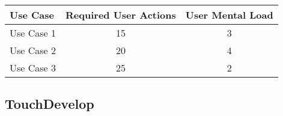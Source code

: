 

\begin{tabular*}{\textwidth}{lcc}
\textbf{Use Case} & \textbf{Required User Actions} & \textbf{User Mental Load}\\
\hline
Use Case 1                          & 15 & 3 \\
Use Case 2                          & 20 & 4 \\
Use Case 3                          & 25 & 2
\end{tabular*}

\subsection{TouchDevelop}




